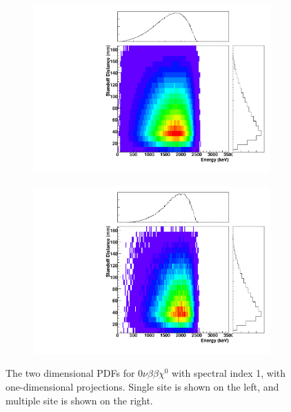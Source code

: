 \documentclass[herrin-thesis.tex]{subfiles}
\begin{document}
\begin{figure}[hp]
\centering
	\begin{subfigure}[b]{0.35\textwidth}
	\centering
	\includegraphics[width=\textwidth]{./plots/PDFs/analysis_pdf_bb0nX1_ss.pdf}
\end{subfigure}\hspace{0.1\textwidth}%
\begin{subfigure}[b]{0.35\textwidth}
	\centering
	\includegraphics[width=1\textwidth]{./plots/PDFs/analysis_pdf_bb0nX1_ms.pdf}
	\end{subfigure}
\caption[PDF for \twonu{}]{The two dimensional PDFs for \(0\nu\beta\beta\chi^{0}\) with spectral index 1, with one-dimensional projections. Single site is shown on the left, and multiple site is shown on the right.}
\label{fig:analysis_pdf_bb0nX1}
\end{figure}
\end{document}
